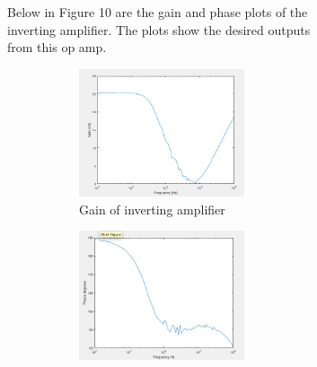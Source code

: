 \begin{figure}[H]
\begin{subfigure}[b]{0.45\textwidth}
 Below in Figure 10 are the gain and phase plots of the inverting amplifier. The plots show the desired outputs from this op amp.
		\begin{figure}[H]
		\centering
			\begin{subfigure}[b]{0.45\textwidth}
				\centering
				\includegraphics[scale=.40]{ExperimentalImplementation/invertingain.png}
				\caption{Gain of inverting amplifier}
				\label{fig:invertinggain}
			\end{subfigure}
		\hfill
			\begin{subfigure}[b]{0.45\textwidth}
				\centering
				\includegraphics[scale=.40]{ExperimentalImplementation/invertingphase.png}

\end{subfigure}
\end{figure}
\end{subfigure}
\end{figure}
